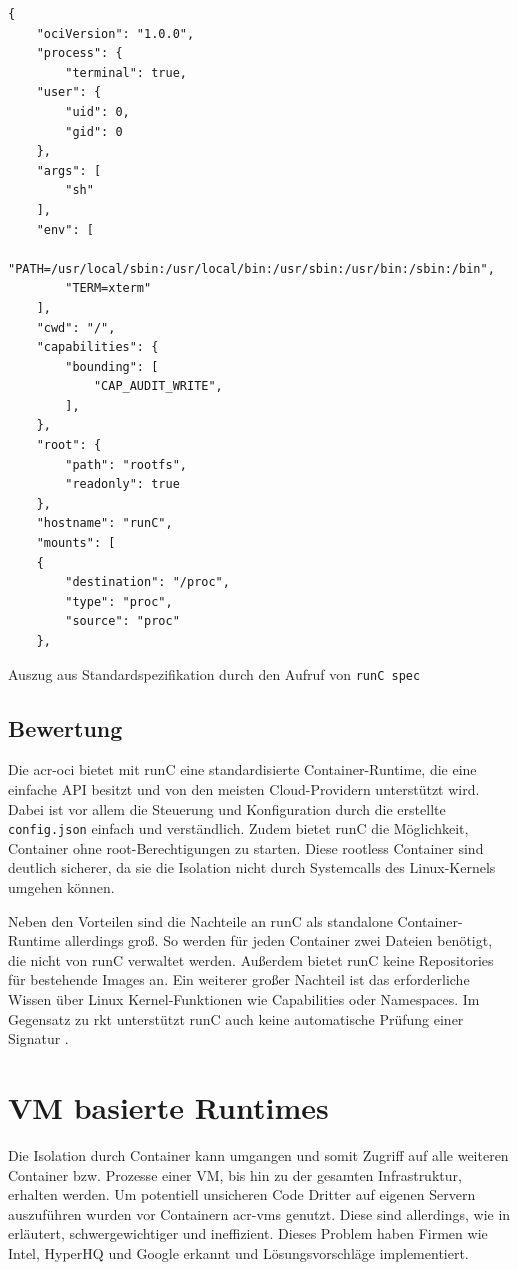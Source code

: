 \begin{listing}[H]
	\begin{verbatim}
{
	"ociVersion": "1.0.0",
	"process": {
		"terminal": true,
	"user": {
		"uid": 0,
		"gid": 0
	},
	"args": [
		"sh"
	],
	"env": [
		"PATH=/usr/local/sbin:/usr/local/bin:/usr/sbin:/usr/bin:/sbin:/bin",
		"TERM=xterm"
	],
	"cwd": "/",
	"capabilities": {
		"bounding": [
			"CAP_AUDIT_WRITE",
		],
	},
	"root": {
		"path": "rootfs",
		"readonly": true
	},
	"hostname": "runC",
	"mounts": [
	{
		"destination": "/proc",
		"type": "proc",
		"source": "proc"
	},
	\end{verbatim}
	\caption{Auszug aus Standardspezifikation durch den Aufruf von \texttt{runC spec}}
	\label{lst:configJSON}
\end{listing}


\subsection{Bewertung}
\label{sec:comprunCBewertung}

Die \gls{acr-oci} bietet mit runC eine standardisierte Container-Runtime, die eine einfache API besitzt und von den meisten Cloud-Providern unterstützt wird. Dabei ist vor allem die Steuerung und Konfiguration durch die erstellte \texttt{config.json} einfach und verständlich. Zudem bietet runC die Möglichkeit, Container ohne root-Berechtigungen zu starten. Diese rootless Container sind deutlich sicherer, da sie die Isolation nicht durch Systemcalls des Linux-Kernels umgehen können.

Neben den Vorteilen sind die Nachteile an runC als standalone Container-Runtime allerdings groß. So werden für jeden Container zwei Dateien benötigt, die nicht von runC verwaltet werden. Außerdem bietet runC keine Repositories für bestehende Images an. Ein weiterer großer Nachteil ist das erforderliche Wissen über Linux Kernel-Funktionen wie Capabilities oder Namespaces. Im Gegensatz zu rkt unterstützt runC auch keine automatische Prüfung einer Signatur \citep{RktVsOtherProjects}. 

\section{VM basierte Runtimes}
\label{sec:compVMbased}
Die Isolation durch Container kann umgangen und somit Zugriff auf alle weiteren Container bzw. Prozesse einer VM, bis hin zu der gesamten Infrastruktur, erhalten werden. Um potentiell unsicheren Code Dritter auf eigenen Servern auszuführen wurden vor Containern \glspl{acr-vm} genutzt. Diese sind allerdings, wie in  erläutert, schwergewichtiger und ineffizient. Dieses Problem haben Firmen wie Intel, HyperHQ und Google erkannt und Lösungsvorschläge implementiert.


